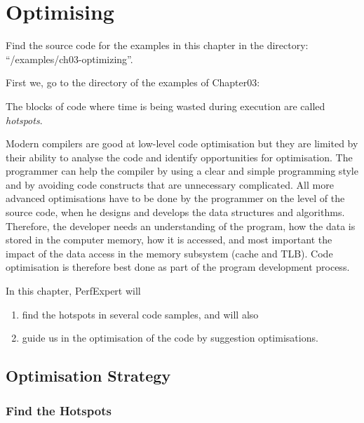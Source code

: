 \chapter{Optimising}
\label{ch:ch03_optimizing}

\renewcommand{\exampledir}{examples/ch03-optimizing}

\begin{tip}
Find the source code for the examples in this chapter in the directory:  ``\tilde/\exampledir''.
\end{tip}

First we, go to the directory of the examples of Chapter03:

\begin{prompt}
\end{prompt}

The blocks of code where time is being wasted during execution are called \emph{hotspots}.

Modern compilers are good at low-level code optimisation but they are limited by their ability to analyse the code and identify opportunities for optimisation. The programmer can help the compiler by using a clear and simple programming style and by avoiding code constructs that are unnecessary complicated. All more advanced optimisations have to be done by the programmer on the level of the source code, when he designs and develops the data structures and algorithms. Therefore, the developer needs an understanding of the program, how the data is stored in the computer memory, how it is accessed, and most important the impact of the data access in the memory subsystem (cache and TLB). Code optimisation is therefore best done as part of the program development process.

In this chapter, PerfExpert will

\begin{enumerate}
  \item  find the hotspots in several code samples, and will also
  \item  guide us in the optimisation of the code by suggestion optimisations.
\end{enumerate}

\section{Optimisation Strategy}
\label{sec:Optimization_Strategy}

\subsection{Find the Hotspots}
\label{subsec:Hotspots}

